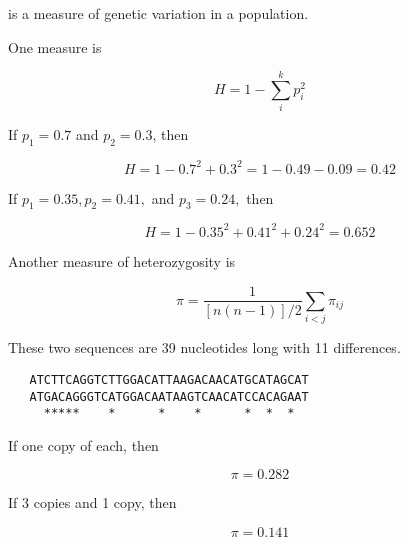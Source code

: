 \documentclass[t]{beamer}
\begin{document}

\begin{frame}[t]{ is a measure of genetic variation in a population.}


One measure is 

\begin{equation*}
H = 1-\sum_{i}^{k}p_i^2
\end{equation*}

\hangpara If $p_1 = 0.7$ and $p_2 = 0.3$, then 

\vspace{-0.5\baselineskip}

\begin{equation*}
H = 1 - 0.7^2 + 0.3^2 = 1-0.49-0.09 = 0.42
\end{equation*}

\hangpara If $p_1 = 0.35, p_2 = 0.41,$ and $p_3 = 0.24,$ then

\vspace{-0.5\baselineskip}

\begin{equation*}
H = 1- 0.35^2 + 0.41^2 + 0.24^2 = 0.652
\end{equation*}


\end{frame}


\begin{frame}[t, fragile]{Another measure of heterozygosity is }

\vspace{-0.5\baselineskip}



\begin{equation*}
\pi = \dfrac{1}{[n(n-1)]/2}\sum_{i<j}\pi_{ij}
\end{equation*}


\hangpara These two sequences are 39 nucleotides long with 11 differences.
{\footnotesize
\begin{verbatim}
   ATCTTCAGGTCTTGGACATTAAGACAACATGCATAGCAT
   ATGACAGGGTCATGGACAATAAGTCAACATCCACAGAAT
     *****    *      *    *      *  *  *
\end{verbatim}
}

\begin{multicols}{2}
\hangpara If one copy of each, then

\begin{equation*}
\pi = 0.282
\end{equation*}

\columnbreak

\hangpara If 3 copies and 1 copy, then

\begin{equation*}
\pi = 0.141
\end{equation*}

\end{multicols}


\end{frame}
\end{document}
